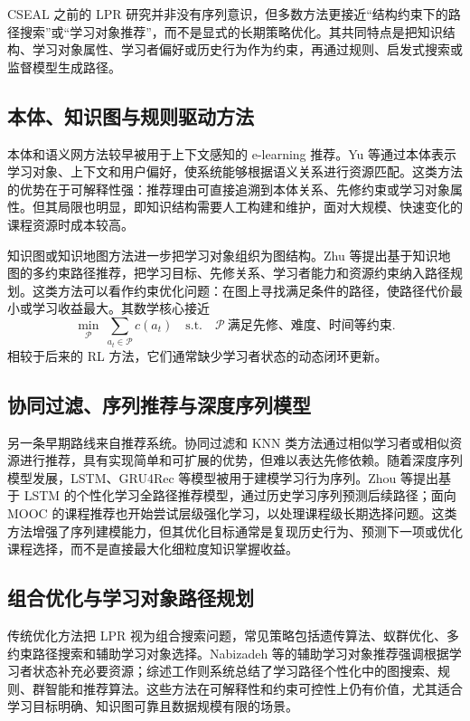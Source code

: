 \documentclass[UTF8,a4paper,zihao=-4]{ctexart}
\begin{document}
CSEAL 之前的 LPR 研究并非没有序列意识，但多数方法更接近“结构约束下的路径搜索”或“学习对象推荐”，而不是显式的长期策略优化。其共同特点是把知识结构、学习对象属性、学习者偏好或历史行为作为约束，再通过规则、启发式搜索或监督模型生成路径。

\subsection{本体、知识图与规则驱动方法}

本体和语义网方法较早被用于上下文感知的 e-learning 推荐。Yu 等通过本体表示学习对象、上下文和用户偏好，使系统能够根据语义关系进行资源匹配\cite{Yu2007Ontology}。这类方法的优势在于可解释性强：推荐理由可直接追溯到本体关系、先修约束或学习对象属性。但其局限也明显，即知识结构需要人工构建和维护，面对大规模、快速变化的课程资源时成本较高。

知识图或知识地图方法进一步把学习对象组织为图结构。Zhu 等提出基于知识地图的多约束路径推荐，把学习目标、先修关系、学习者能力和资源约束纳入路径规划\cite{Zhu2018KnowledgeMap}。这类方法可以看作约束优化问题：在图上寻找满足条件的路径，使路径代价最小或学习收益最大。其数学核心接近
\begin{equation}
\min_{\mathcal{P}}\ \sum_{a_t\in\mathcal{P}}c(a_t)
\quad \mathrm{s.t.}\quad
\mathcal{P}\ \text{满足先修、难度、时间等约束}.
\end{equation}
相较于后来的 RL 方法，它们通常缺少学习者状态的动态闭环更新。

\subsection{协同过滤、序列推荐与深度序列模型}

另一条早期路线来自推荐系统。协同过滤和 KNN 类方法通过相似学习者或相似资源进行推荐，具有实现简单和可扩展的优势，但难以表达先修依赖。随着深度序列模型发展，LSTM、GRU4Rec 等模型被用于建模学习行为序列。Zhou 等提出基于 LSTM 的个性化学习全路径推荐模型，通过历史学习序列预测后续路径\cite{Zhou2018LSTM}；面向 MOOC 的课程推荐也开始尝试层级强化学习，以处理课程级长期选择问题\cite{Zhang2019MOOC}。这类方法增强了序列建模能力，但其优化目标通常是复现历史行为、预测下一项或优化课程选择，而不是直接最大化细粒度知识掌握收益。

\subsection{组合优化与学习对象路径规划}

传统优化方法把 LPR 视为组合搜索问题，常见策略包括遗传算法、蚁群优化、多约束路径搜索和辅助学习对象选择。Nabizadeh 等的辅助学习对象推荐强调根据学习者状态补充必要资源\cite{Nabizadeh2020Auxiliary}；综述工作则系统总结了学习路径个性化中的图搜索、规则、群智能和推荐算法\cite{Nabizadeh2020Survey}。这些方法在可解释性和约束可控性上仍有价值，尤其适合学习目标明确、知识图可靠且数据规模有限的场景。
\end{document}
